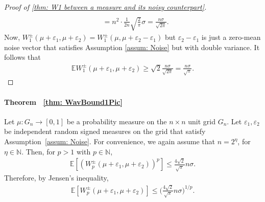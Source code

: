 \documentclass{article}
\theoremstyle{plain}
\theoremstyle{definition}
\theoremstyle{remark}
\newcommand{\E}{\mathbb{E}}
\begin{document}
\begin{proof}[Proof of \cref{thm: W1 between a measure and its noisy counterpart}]
\begin{align}
    \\
    &=
    n^2 \cdot \frac{1}{2n} \sqrt{\frac{2}{\pi}} \sigma
    = \frac{n \sigma}{\sqrt{2 \pi}}. \nonumber
\end{align}
Now, $ W^{\pm}_1(\mu+\varepsilon_1,\mu+\varepsilon_2) = W^{\pm}_1(\mu,\mu+\varepsilon_2-\varepsilon_1) $ but $\varepsilon_2-\varepsilon_1$ is just a zero-mean noise vector that satisfies Assumption \ref{assum: Noise} but with double variance.
It follows that
\begin{align}
    \mathbb{E} W^{\pm}_1(\mu+\varepsilon_1,\mu+\varepsilon_2)
    \ge
    \sqrt{2} \frac{n \sigma}{\sqrt{2\pi}}
    =
    \frac{n \sigma}{\sqrt{\pi}}.  
\end{align}
\end{proof}



\paragraph{\textbf{Theorem ~\ref{thm: WavBound1Pic}}}
    Let $\mu:G_n \to [0,1]$ be a probability measure on the $n \times n $ unit grid $G_n$. Let $\varepsilon_1, \varepsilon_2$ be independent random signed measures on the grid that satisfy Assumption~\ref{assum: Noise}. For convenience, we again assume that $n=2^\eta$, for $\eta \in \mathbb{N}$.
    Then, for $p>1$ with $p \in \mathbb{N}$,
    \begin{align}
       \E \left[ \left( W_p^\pm( \mu+\varepsilon_1, \mu + \varepsilon_2  )\right)^p \right]
       \le  
        \frac{4\sqrt{2}}{\sqrt{\pi}} n\sigma .
    \end{align}
    Therefore, by Jensen's inequality, 
    \begin{align}
    \E \left[  W_p^\pm( \mu+\varepsilon_1, \mu+\varepsilon_2 ) \right]
       \le  
        \bigg(
            \frac{4\sqrt{2}}{\sqrt{\pi}}
            n\sigma
        \bigg)^{1/p}.
    \end{align}
\end{document}
